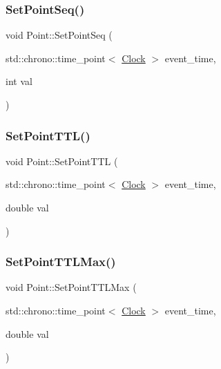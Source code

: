 \mbox{\label{classPoint_a912aefb007184f73b86c37257a415237}} 
\subsubsection{\texorpdfstring{Set\+Point\+Seq()}{SetPointSeq()}}
{\footnotesize\ttfamily void Point\+::\+Set\+Point\+Seq (\begin{DoxyParamCaption}\item[{std\+::chrono\+::time\+\_\+point$<$ \mbox{\hyperlink{universe_8h_a0ef8d951d1ca5ab3cfaf7ab4c7a6fd80}{Clock}} $>$}]{event\+\_\+time,  }\item[{int}]{val }\end{DoxyParamCaption})\hspace{0.3cm}{\ttfamily [inline]}}

\mbox{\label{classPoint_a60ccff89b647d069146a596b8c43d123}} 
\subsubsection{\texorpdfstring{Set\+Point\+T\+T\+L()}{SetPointTTL()}}
{\footnotesize\ttfamily void Point\+::\+Set\+Point\+T\+TL (\begin{DoxyParamCaption}\item[{std\+::chrono\+::time\+\_\+point$<$ \mbox{\hyperlink{universe_8h_a0ef8d951d1ca5ab3cfaf7ab4c7a6fd80}{Clock}} $>$}]{event\+\_\+time,  }\item[{double}]{val }\end{DoxyParamCaption})\hspace{0.3cm}{\ttfamily [inline]}}

\mbox{\label{classPoint_a1227b110f1fa0aab599f9374ea5ec484}} 
\subsubsection{\texorpdfstring{Set\+Point\+T\+T\+L\+Max()}{SetPointTTLMax()}}
{\footnotesize\ttfamily void Point\+::\+Set\+Point\+T\+T\+L\+Max (\begin{DoxyParamCaption}\item[{std\+::chrono\+::time\+\_\+point$<$ \mbox{\hyperlink{universe_8h_a0ef8d951d1ca5ab3cfaf7ab4c7a6fd80}{Clock}} $>$}]{event\+\_\+time,  }\item[{double}]{val }\end{DoxyParamCaption})\hspace{0.3cm}{\ttfamily [inline]}}

